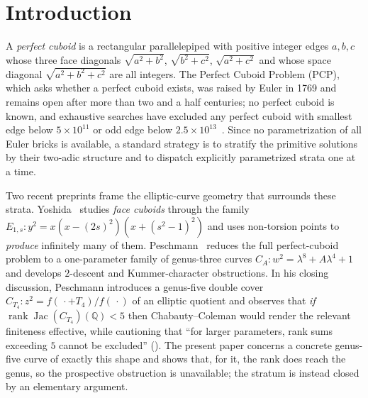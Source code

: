 \documentclass[11pt,reqno]{amsart}
\theoremstyle{plain}
\theoremstyle{definition}
\newcommand{\Q}{\mathbb{Q}}
\DeclareMathOperator{\Jac}{Jac}
\DeclareMathOperator{\rank}{rank}
\begin{document}
\maketitle

\section{Introduction}\label{sec:intro}

A \emph{perfect cuboid} is a rectangular parallelepiped with positive integer
edges $a,b,c$ whose three face diagonals $\sqrt{a^2+b^2}$, $\sqrt{b^2+c^2}$,
$\sqrt{a^2+c^2}$ and whose space diagonal $\sqrt{a^2+b^2+c^2}$ are all integers.
The Perfect Cuboid Problem (PCP), which asks whether a perfect cuboid exists,
was raised by Euler in 1769 and remains open after more than two and a half
centuries; no perfect cuboid is known, and exhaustive searches have excluded
any perfect cuboid with smallest edge below $5\times10^{11}$ or odd edge below
$2.5\times10^{13}$~\cite{matson}. Since no
parametrization of all Euler bricks is available, a standard strategy is to
stratify the primitive solutions by their two-adic structure and to dispatch
explicitly parametrized strata one at a time.

Two recent preprints frame the elliptic-curve geometry that surrounds these
strata. Yoshida~\cite{yoshida} studies \emph{face cuboids} through the family
$E_{1,s}:y^2=x(x-(2s)^2)(x+(s^2-1)^2)$ and uses non-torsion points to
\emph{produce} infinitely many of them. Peschmann~\cite{peschmann} reduces the
full perfect-cuboid problem to a one-parameter family of genus-three curves
$C_A:w^2=\lambda^8+A\lambda^4+1$ and develops $2$-descent and Kummer-character
obstructions. In his closing discussion, Peschmann introduces a genus-five
double cover $C_{T_4}:z^2=f(\,\cdot+T_4)/f(\,\cdot)$ of an elliptic quotient
and observes that \emph{if} $\rank\Jac(C_{T_4})(\Q)<5$ then Chabauty--Coleman
would render the relevant finiteness effective, while cautioning that ``for
larger parameters, rank sums exceeding $5$ cannot be excluded''
(\cite[\S8]{peschmann}). The present paper concerns a concrete genus-five curve
of exactly this shape and shows that, for it, the rank does reach the genus, so
the prospective obstruction is unavailable; the stratum is instead closed by an
elementary argument.
\end{document}
